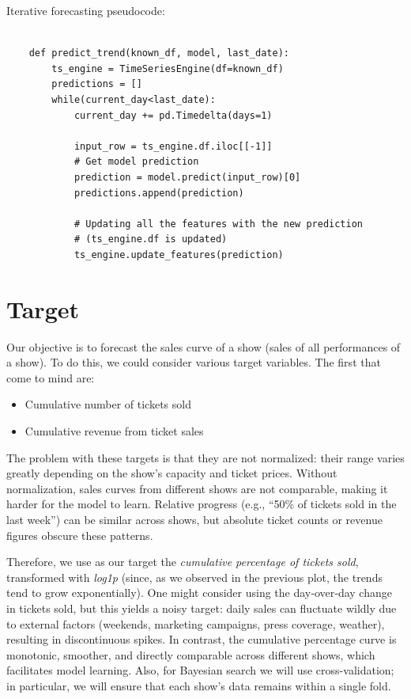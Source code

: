 \documentclass{Configuration_Files/PoliMi3i_thesis}
\begin{document}
Iterative forecasting pseudocode:
\begin{verbatim}
    
    def predict_trend(known_df, model, last_date):
        ts_engine = TimeSeriesEngine(df=known_df)
        predictions = []
        while(current_day<last_date):
            current_day += pd.Timedelta(days=1)
            
            input_row = ts_engine.df.iloc[[-1]]
            # Get model prediction
            prediction = model.predict(input_row)[0]
            predictions.append(prediction)
            
            # Updating all the features with the new prediction
            # (ts_engine.df is updated)
            ts_engine.update_features(prediction)

      \end{verbatim}
\section{Target}
Our objective is to forecast the sales curve of a show (sales of all performances of a show).  To do this, we could consider various target variables. The first that come to mind are:
\begin{itemize}
  \item Cumulative number of tickets sold
  \item Cumulative revenue from ticket sales
\end{itemize}
The problem with these targets is that they are not normalized: their range varies greatly depending on the show’s capacity and ticket prices.  Without normalization, sales curves from different shows are not comparable, making it harder for the model to learn.  Relative progress (e.g., “50\% of tickets sold in the last week”) can be similar across shows, but absolute ticket counts or revenue figures obscure these patterns.

Therefore, we use as our target the \emph{cumulative percentage of tickets sold}, transformed with \emph{log1p} (since, as we observed in the previous plot, the trends tend to grow exponentially).  One might consider using the day‐over‐day change in tickets sold, but this yields a noisy target: daily sales can fluctuate wildly due to external factors (weekends, marketing campaigns, press coverage, weather), resulting in discontinuous spikes.  In contrast, the cumulative percentage curve is monotonic, smoother, and directly comparable across different shows, which facilitates model learning. Also, for Bayesian search we will use cross-validation; in particular, we will ensure that each show’s data remains within a single fold.
\end{document}
